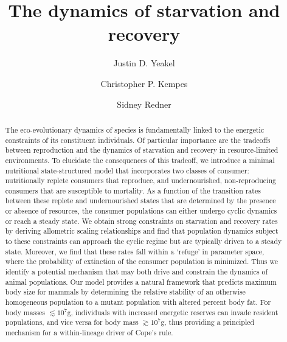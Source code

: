 \documentclass[twocolumn,preprintnumbers,amsmath,amssymb,superscriptaddress]{revtex4}
\begin{document}
\author{Justin D. Yeakel} 

\author{Christopher P. Kempes} 

\author{Sidney Redner} 

\title{The dynamics of starvation and recovery}%



\begin{abstract}

The eco-evolutionary dynamics of species is fundamentally linked to the
energetic constraints of its constituent individuals.  Of particular
importance are the tradeoffs between reproduction and the dynamics of
starvation and recovery in resource-limited environments.  To elucidate the
consequences of this tradeoff, we introduce a minimal nutritional
state-structured model that incorporates two classes of consumer:
nutritionally replete consumers that reproduce, and undernourished,
non-reproducing consumers that are susceptible to mortality.  As a function
of the transition rates between these replete and undernourished states that
are determined by the presence or absence of resources, the consumer
populations can either undergo cyclic dynamics or reach a steady state.  We
obtain strong constraints on starvation and recovery rates by deriving
allometric scaling relationships and find that population dynamics subject to
these constraints can approach the cyclic regime but are typically driven to
a steady state.  Moreover, we find that these rates fall within a `refuge' in
parameter space, where the probability of extinction of the consumer
population is minimized.  Thus we identify a potential mechanism that may
both drive and constrain the dynamics of animal populations.  Our model
provides a natural framework that predicts maximum body size for mammals by
determining the relative stability of an otherwise homogeneous population to
a mutant population with altered percent body fat.  For body masses
$\lesssim 10^7$g, individuals with increased energetic reserves can invade
resident populations, and vice versa for body mass $\gtrsim 10^7$g, thus
providing a principled mechanism for a within-lineage driver of Cope's rule.

\end{abstract}
\end{document}
